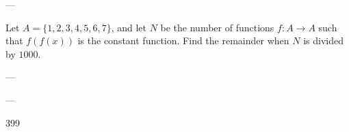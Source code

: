 
---

Let $A=\{1,2,3,4,5,6,7\}$, and let $N$ be the number of functions $f:A\to A$ such that $f(f(x))$ is the constant function. Find the remainder when $N$ is divided by $1000$.

---

---

399

